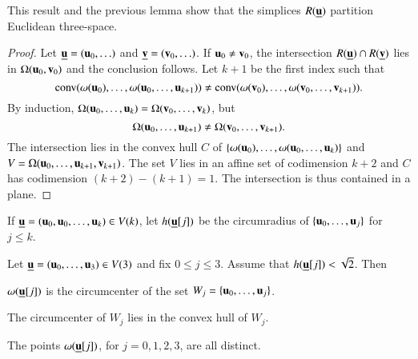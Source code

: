 This result and the previous lemma show that the simplices $R({\underline{{\mathbf u}}})$ partition Euclidean
three-space.

\begin{proof}  Let ${\underline{{\mathbf u}}} = ( {\mathbf u}_0,\ldots)$ and ${\underline{{\mathbf v}}} = ({\mathbf v}_0,\ldots)$.
If $ {\mathbf u}_0\ne{\mathbf v}_0$, the intersection $R({\underline{{\mathbf u}}})\cap R({\underline{{\mathbf v}}})$  lies in $\Omega( {\mathbf u}_0,{\mathbf v}_0)$
and the conclusion follows.  Let $k+1$ be the first index such that
\begin{displaymath}{\operatorname{conv}}(\omega( {\mathbf u}_0),\ldots,\omega( {\mathbf u}_0,\ldots, {\mathbf u}_{k+1}))\ne
{\operatorname{conv}}(\omega({\mathbf v}_0),\ldots,\omega({\mathbf v}_0,\ldots,{\mathbf v}_{k+1})).
\end{displaymath}
By induction, $\Omega( {\mathbf u}_0,\ldots, {\mathbf u}_k) = \Omega({\mathbf v}_0,\ldots,{\mathbf v}_k)$,
but
\begin{displaymath}\Omega( {\mathbf u}_0,\ldots, {\mathbf u}_{k+1}) \ne \Omega({\mathbf v}_0,\ldots,{\mathbf v}_{k+1}).\end{displaymath}
The intersection lies in the convex hull $C$ of
$\{\omega( {\mathbf u}_0),\ldots,\omega( {\mathbf u}_0,\ldots, {\mathbf u}_k)\}$ and
$V=\Omega( {\mathbf u}_0,\ldots, {\mathbf u}_{k+1},{\mathbf v}_{k+1})$.  The set $V$ lies in an affine set of 
codimension $k+2$
and $C$ has codimension $(k+2) - (k+1) = 1$.  The intersection is thus contained in a plane.
\end{proof}

\begin{definition}[h]
If ${\underline{{\mathbf u}}}=( {\mathbf u}_0, {\mathbf u}_0,\ldots, {\mathbf u}_k)\in V(k)$, 
let $h({\underline{{\mathbf u}}}[j])$ be the circumradius of $\{ {\mathbf u}_0,\ldots, {\mathbf u}_j\}$ for $j\le k$.
\end{definition}
%

\begin{lemma}\label{lemma:v2} 
Let ${\underline{{\mathbf u}}}=( {\mathbf u}_0,\ldots, {\mathbf u}_3)\in V(3)$ and fix $0\le j\le 3$.  Assume that $h({\underline{{\mathbf u}}}[j])<\sqrt2$.
Then 
\begin{nomerate}
\item {} $\omega({\underline{{\mathbf u}}}[j])$ is the circumcenter of the set $W_j =\{ {\mathbf u}_0,\ldots, {\mathbf u}_j\}$. 
\item {} The circumcenter of $W_j$  lies in the convex hull of $W_j$.  
\item {}  The points $\omega({\underline{{\mathbf u}}}[j])$, for $j=0,1,2,3$, are all distinct.
\end{nomerate}
\end{lemma}
%

